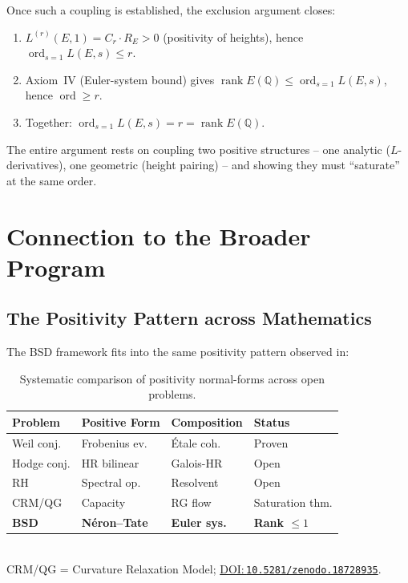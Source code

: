 \documentclass[aps,prd,twocolumn,superscriptaddress,nofootinbib,floatfix]{revtex4-2}
\newcommand{\doilink}[1]{\href{https://doi.org/#1}{DOI:\,\nolinkurl{#1}}}
\theoremstyle{definition}
\theoremstyle{remark}
\DeclareMathOperator{\ord}{ord}
\DeclareMathOperator{\rank}{rank}
\begin{document}
Once such a coupling is established, the exclusion argument closes:
\begin{enumerate}
\item $L^{(r)}(E,1) = C_r \cdot R_E > 0$ (positivity of heights), hence $\ord_{s=1} L(E,s) \leq r$.
\item Axiom~IV (Euler-system bound) gives $\rank E(\mathbb{Q}) \leq \ord_{s=1} L(E,s)$, hence $\ord \geq r$.
\item Together: $\ord_{s=1} L(E,s) = r = \rank E(\mathbb{Q})$.
\end{enumerate}

The entire argument rests on coupling two positive structures -- one analytic ($L$-derivatives), one geometric (height pairing) -- and showing they must ``saturate'' at the same order.


\clearpage
\section{Connection to the Broader Program}
\label{sec:connection}

\subsection{The Positivity Pattern across Mathematics}

The BSD framework fits into the same positivity pattern observed in:

\begin{table}[t]
\centering
\small
\caption{Systematic comparison of positivity normal-forms across open problems.}
\label{tab:program_comparison}
\begin{tabular*}{\textwidth}{@{\extracolsep{\fill}}llll@{}}
\toprule
\textbf{Problem} & \textbf{Positive Form} & \textbf{Composition} & \textbf{Status} \\
\midrule
Weil conj. & Frobenius ev. & Étale coh. & Proven \\
\addlinespace
Hodge conj. & HR bilinear & Galois-HR & Open \\
\addlinespace
RH~\cite{GeigerRH2026c} & Spectral op. & Resolvent & Open \\
\addlinespace
CRM/QG~\cite{FST-Unified2026} & Capacity & RG flow & Saturation thm. \\
\addlinespace
\textbf{BSD} & \textbf{Néron--Tate} & \textbf{Euler sys.} & \textbf{Rank $\leq 1$} \\
\bottomrule
\end{tabular*}\\[4pt]
{\footnotesize CRM/QG = Curvature Relaxation Model; \doilink{10.5281/zenodo.18728935}.}
\end{table}
\end{document}
